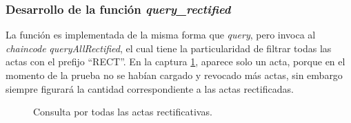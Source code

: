 \subsubsection{Desarrollo de la función \textit{query\_rectified}}
La función es implementada de la misma forma que \textit{query}, pero invoca al \textit{chaincode} \textit{queryAllRectified}, el cual tiene la particularidad de filtrar todas las actas con el prefijo ``RECT''. En la captura \ref{fig:all_rectified}, aparece solo un acta, porque en el momento de la prueba no se habían cargado y revocado más actas, sin embargo siempre figurará la cantidad correspondiente a las actas rectificadas.
\begin{figure}
    \caption{Consulta por todas las actas rectificativas.}
    \label{fig:all_rectified}
\end{figure}
